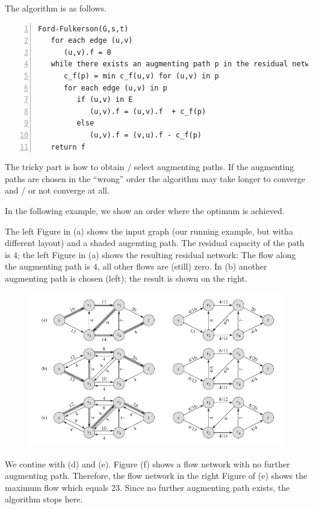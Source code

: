 The algorithm is as follows.

\begin{Verbatim}[numbers=left, xleftmargin=5mm]
Ford-Fulkerson(G,s,t)
   for each edge (u,v)
      (u,v).f = 0
   while there exists an augmenting path p in the residual network G_f
      c_f(p) = min c_f(u,v) for (u,v) in p
      for each edge (u,v) in p
         if (u,v) in E
            (u,v).f = (u,v).f  + c_f(p)
         else
            (u,v).f = (v,u).f - c_f(p)   
   return f
\end{Verbatim}

The tricky part is how to obtain / select augmenting paths. If the augmenting paths are chosen in the ``wrong'' order the algorithm may take longer to converge and / or not converge at all.

In the following example, we show an order where the optimum is achieved.

The left Figure in (a) shows the input graph (our running example, but witha different layout) and a shaded augemting path. The residual capacity of the path is $4$; the left Figure in (a) shows the resulting residual network: The flow along the augmenting path is $4$, all other flows are (still) zero. In (b) another augmenting path is chosen (left); the result is shown on the right.

\begin{figure}[H] \centering
\includegraphics[scale=0.5]{images/max_flow_ex_1.png}
\end{figure}

We contine with (d) and (e). Figure (f) shows a flow network with no further augmenting path. Therefore, the flow network in the right Figure of (e) shows the maximum flow which equals $23$. Since no further augmenting path exists, the algorithm stops here.

